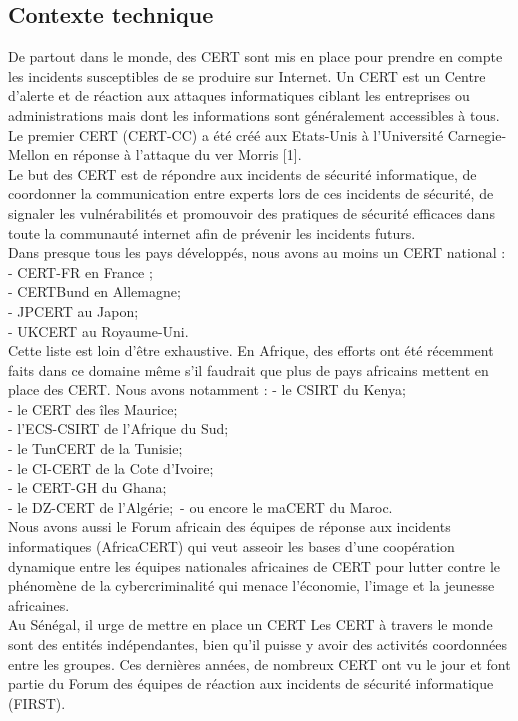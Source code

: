 \subsection{Contexte technique}
De partout dans le monde, des CERT sont mis en place pour prendre en compte les incidents susceptibles de se produire sur Internet. Un CERT est un Centre d’alerte et de réaction aux attaques informatiques ciblant les entreprises ou administrations mais dont les informations sont généralement accessibles à tous. Le premier CERT (CERT-CC) a été créé aux Etats-Unis à l’Université Carnegie-Mellon en réponse à l’attaque du ver Morris [1]. \\
Le but des CERT est de répondre aux incidents de sécurité informatique, de coordonner la communication entre experts lors de ces incidents de sécurité, de signaler les vulnérabilités et promouvoir des pratiques de sécurité efficaces dans toute la communauté internet afin de prévenir les incidents futurs. \\
Dans presque tous les pays développés, nous avons au moins un CERT national : \\
- CERT-FR en France ; \\
- CERTBund en Allemagne; \\ 
- JPCERT au Japon; \\
- UKCERT au Royaume-Uni.\\
Cette liste est loin d'être exhaustive.
En Afrique, des efforts ont été récemment faits  dans ce domaine même s’il faudrait que plus de pays africains mettent en place des CERT. Nous avons notamment :
- le CSIRT du Kenya;\\
- le CERT des îles Maurice;\\
- l’ECS-CSIRT de l’Afrique du Sud;\\
- le TunCERT de la Tunisie;\\
- le CI-CERT de la Cote d’Ivoire;\\
- le CERT-GH du Ghana;\\
- le DZ-CERT de l’Algérie;\
- ou encore le maCERT du Maroc. \\ 
Nous avons aussi le Forum africain des équipes de réponse aux incidents informatiques (AfricaCERT) qui veut asseoir les bases d’une coopération dynamique entre les équipes nationales africaines de CERT pour lutter contre le phénomène de la cybercriminalité qui menace l’économie, l’image et la jeunesse africaines.\\
Au Sénégal, il urge de mettre en place un CERT
Les CERT à travers le monde sont des entités indépendantes, bien qu'il puisse y avoir des activités coordonnées entre les groupes. Ces dernières années, de nombreux CERT ont vu le jour et font partie du Forum des équipes de réaction aux incidents de sécurité informatique (FIRST). \\

